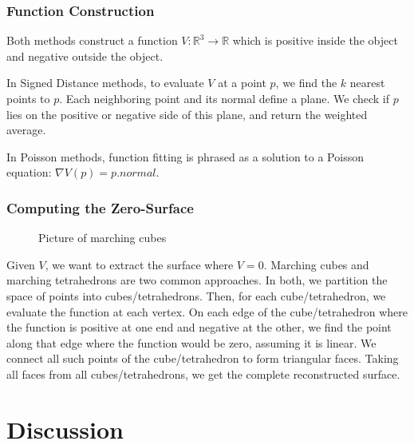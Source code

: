 \documentclass[10pt,twocolumn,letterpaper]{article}
\begin{document}

\subsubsection{Function Construction}

Both methods construct a function $V: \mathbb{R}^3 \rightarrow \mathbb{R}$ which is positive inside the object and negative outside the object.

In Signed Distance methods\cite{hoppe1992surface}, to evaluate $V$ at a point $p$, we find the $k$ nearest points to $p$. Each neighboring point and its normal define a plane. We check if $p$ lies on the positive or negative side of this plane, and return the weighted average.\cite{surface_review, hoppe1992surface}

In Poisson methods\cite{poisson}, function fitting is phrased as a solution to a Poisson equation: $\nabla V(p) = p.normal$.\cite{surface_review, poisson}

\subsubsection{Computing the Zero-Surface}

\begin{figure}[t]
  \begin{center}
    \fbox{\rule{0pt}{2in} \rule{0.9\linewidth}{0pt}}
  \end{center}
  \caption{Picture of marching cubes}
\end{figure}

Given $V$, we want to extract the surface where $V=0$. Marching cubes and marching tetrahedrons are two common approaches. In both, we partition the space of points into cubes/tetrahedrons. Then, for each cube/tetrahedron, we evaluate the function at each vertex. On each edge of the cube/tetrahedron where the function is positive at one end and negative at the other, we find the point along that edge where the function would be zero, assuming it is linear. We connect all such points of the cube/tetrahedron to form triangular faces. Taking all faces from all cubes/tetrahedrons, we get the complete reconstructed surface.\cite{tri_table}


\section{Discussion}
\end{document}

